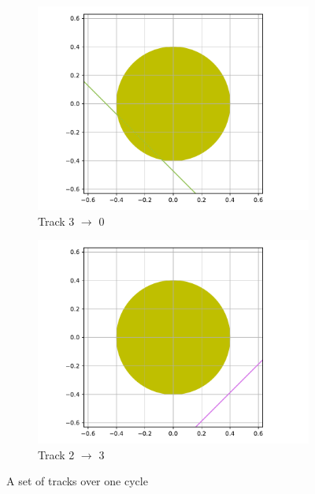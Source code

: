 \documentclass[12pt]{article}
\begin{document}
\begin{figure}[H]
\begin{subfigure}[b]{0.45\textwidth}
            \centering 
            \includegraphics[width=\textwidth]{figs/Cyc4.pdf}
            \caption{Track 3 $\rightarrow$ 0}
        \end{subfigure}
        \quad
        \begin{subfigure}[b]{0.45\textwidth}   
            \centering 
            \includegraphics[width=\textwidth]{figs/Cyc3.pdf}
            \caption{Track 2 $\rightarrow$ 3}
        \end{subfigure}
        \caption{A set of tracks over one cycle}
        \label{fig:fourtracks}
    \end{figure}
\end{document}
